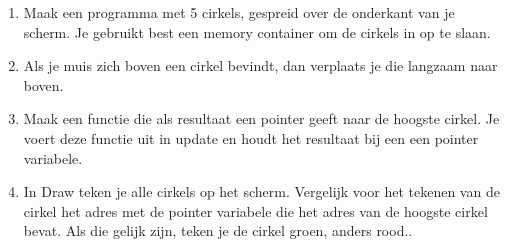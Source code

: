 \begin{exercise}
\begin{enumerate}
  \item Maak een programma met 5 cirkels, gespreid over de onderkant van je scherm. Je gebruikt best een memory container om de cirkels in op te slaan.
	\item Als je muis zich boven een cirkel bevindt, dan verplaats je die langzaam naar boven.
	\item Maak een functie die als resultaat een pointer geeft naar de hoogste cirkel. Je voert deze functie uit in update en houdt het resultaat bij een een pointer variabele.
	\item In Draw teken je alle cirkels op het scherm. Vergelijk voor het tekenen van de cirkel het adres met de pointer variabele die het adres van de hoogste cirkel bevat. Als die gelijk zijn, teken je de cirkel groen, anders rood..
\end{enumerate}
\end{exercise}

	